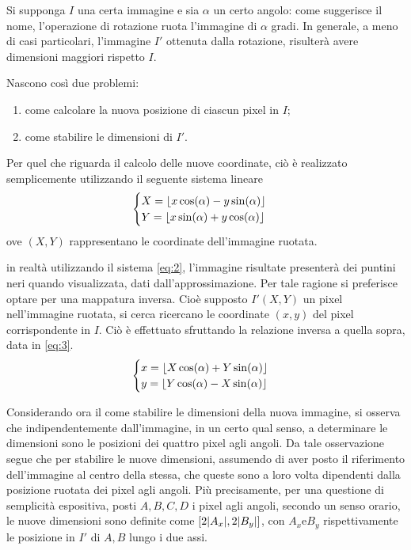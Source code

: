 \documentclass{subfiles}
\begin{document}
Si supponga \(I\) una certa immagine e sia \(\alpha\) un certo angolo: come suggerisce il nome, l'operazione di rotazione ruota l'immagine di \(\alpha\) gradi.
In generale, a meno di casi particolari\footnotemark[7], l'immagine \(I'\) ottenuta dalla rotazione, risulterà avere dimensioni maggiori rispetto \(I\).

Nascono così due problemi:
\begin{enumerate}
    \item come calcolare la nuova posizione di ciascun pixel in \(I\);
    \item come stabilire le dimensioni di \(I'\).
\end{enumerate}

Per quel che riguarda il calcolo delle nuove coordinate, ciò è realizzato semplicemente utilizzando il seguente sistema lineare
\begin{equation}
    \begin{cases}
        X = \left\lfloor x \cos(\alpha) - y \sin(\alpha) \right\rfloor \\
        Y = \left\lfloor x \sin(\alpha) + y \cos(\alpha) \right\rfloor \\
    \end{cases}
\end{equation}
ove \((X, Y)\) rappresentano le coordinate dell'immagine ruotata.

\begin{Remark*}
    in realtà utilizzando il sistema \eqref{eq:2}, l'immagine risultate presenterà dei puntini neri quando visualizzata, dati dall'approssimazione.
    Per tale ragione si preferisce optare per una mappatura inversa. Cioè supposto \(I'(X, Y)\) un pixel nell'immagine ruotata,
    si cerca ricercano le coordinate \((x, y)\) del pixel corrispondente in \(I\). Ciò è effettuato sfruttando la relazione inversa a quella sopra, data in \eqref{eq:3}.
    \begin{equation}
        \begin{cases}
            x = \left\lfloor X \cos(\alpha) + Y \sin(\alpha) \right\rfloor  \\
            y = \left\lfloor Y \cos(\alpha) -  X \sin(\alpha) \right\rfloor \\
        \end{cases}
    \end{equation}
\end{Remark*}

Considerando ora il come stabilire le dimensioni della nuova immagine, si osserva che indipendentemente dall'immagine, in un certo qual senso,
a determinare le dimensioni sono le posizioni dei quattro pixel agli angoli. Da tale osservazione segue che per stabilire le nuove dimensioni,
assumendo di aver posto il riferimento dell'immagine al centro della stessa, che queste sono a loro volta dipendenti dalla posizione ruotata dei pixel agli angoli.
Più precisamente, per una questione di semplicità espositiva, posti \(A, B, C, D\) i pixel agli angoli, secondo un senso orario,
le nuove dimensioni sono definite come \([2 \abs{A_{x}}, 2 \abs{B_{y}}]\), con \(A_{x} \text{e} B_{y}\) rispettivamente le posizione in \(I'\) di \(A, B\) lungo i due assi.
\end{document}
